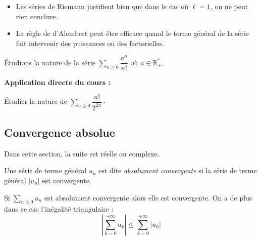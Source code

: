 \documentclass[french,11pt,twoside]{VcCours}
\newenvironment{ApplicationDirecte}{\textbf{Application directe du cours :}

}{}
\newcommand{\Sum}[2]{\ensuremath{\textstyle{\sum\limits_{#1}^{#2}}}}
\begin{document}
\begin{Remarques}{}
	\begin{itemize}
\item Les séries de Riemann justifient bien que dans le cas où $\ell=1$, on ne peut rien conclure.
\item La règle de d'Alembert peut être efficace quand le terme général de la série fait intervenir des puissances ou des factorielles.
	\end{itemize}
\end{Remarques}

\begin{Exemple} Étudions la nature de la série $\Sum{n \geq 0}{} \dfrac{a^n}{n!}$ où $a \in \mathbb{R}_+^{*}$.

\vspace{3cm}
\end{Exemple}

\begin{ApplicationDirecte} Étudier la nature de $\Sum{n \geq 0}{} \dfrac{n!}{2^{2n}}\cdot$
\end{ApplicationDirecte}
\subsection{Convergence absolue}

Dans cette section, la suite est réelle ou complexe.

\begin{Definition}{} Une série de terme général $u_n$ est dite \emph{absolument convergente} si la série de terme général $\vert u_n \vert$ est convergente.
\end{Definition}

\begin{Theoreme}{} Si $\Sum{n \geq 0}{} u_n$ est absolument convergente alors elle est convergente. On a de plus dans ce cas l'inégalité triangulaire :
$$ \left\vert \sum_{k=0}^{+ \infty} u_k \right\vert \leq \sum_{k=0}^{+ \infty} \vert u_k \vert$$
\end{Theoreme}
\end{document}
